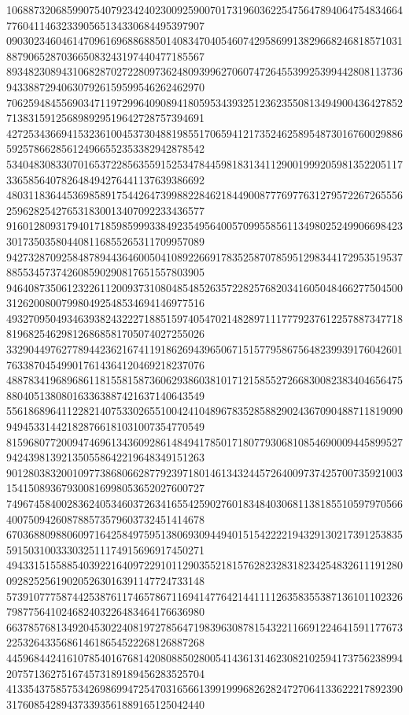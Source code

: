 \begin{DoxyCode}
      106887320685990754079234240230092590070173196036225475647894064754834664776041146323390565134330684495397907
      090302346046147096169688688501408347040546074295869913829668246818571031887906528703665083243197440477185567
      893482308943106828702722809736248093996270607472645539925399442808113736943388729406307926159599546262462970
      706259484556903471197299640908941805953439325123623550813494900436427852713831591256898929519642728757394691
      427253436694153236100453730488198551706594121735246258954873016760029886592578662856124966552353382942878542
      534048308330701653722856355915253478445981831341129001999205981352205117336585640782648494276441137639386692
      480311836445369858917544264739988228462184490087776977631279572267265556259628254276531830013407092233436577
      916012809317940171859859993384923549564005709955856113498025249906698423301735035804408116855265311709957089
      942732870925848789443646005041089226691783525870785951298344172953519537885534573742608590290817651557803905
      946408735061232261120093731080485485263572282576820341605048466277504500312620080079980492548534694146977516
      493270950493463938243222718851597405470214828971117779237612257887347718819682546298126868581705074027255026
      332904497627789442362167411918626943965067151577958675648239939176042601763387045499017614364120469218237076
      488783419689686118155815873606293860381017121585527266830082383404656475880405138080163363887421637140643549
      556186896411228214075330265510042410489678352858829024367090488711819090949453314421828766181031007354770549
      815968077200947469613436092861484941785017180779306810854690009445899527942439813921350558642219648349151263
      901280383200109773868066287792397180146134324457264009737425700735921003154150893679300816998053652027600727
      749674584002836240534603726341655425902760183484030681138185510597970566400750942608788573579603732451414678
      670368809880609716425849759513806930944940151542222194329130217391253835591503100333032511174915696917450271
      494331515588540392216409722910112903552181576282328318234254832611191280092825256190205263016391147724733148
      573910777587442538761174657867116941477642144111126358355387136101102326798775641024682403226483464176636980
      663785768134920453022408197278564719839630878154322116691224641591177673225326433568614618654522268126887268
      445968442416107854016768142080885028005414361314623082102594173756238994207571362751674573189189456283525704
      413354375857534269869947254703165661399199968262824727064133622217892390317608542894373393561889165125042440

\end{DoxyCode}
